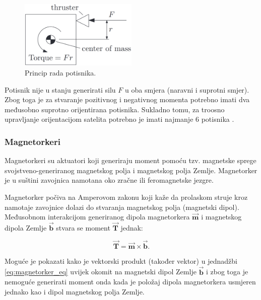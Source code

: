 \documentclass[times, utf8, diplomski, numeric]{templates/template}
\begin{document}
{{{{                \begin{figure}[htb]
                \centering
                \includegraphics[width=0.5\textwidth]{images/thruster_img.png}
                \caption{Princip rada potisnika.}
                \label{fig:thruster_img}
                \end{figure}

                Potisnik nije u stanju generirati silu $F$ u oba smjera (naravni i suprotni smjer). Zbog toga je za stvaranje pozitivnog i negativnog momenta potrebno imati dva međusobno suprotno orijentirana potisnika. Sukladno tomu, za troosno upravljanje orijentacijom satelita potrebno je imati najmanje 6 potisnika \cite{adcsKnjiga}.
            }

            \subsubsection{Magnetorkeri }{
                Magnetorkeri su aktuatori koji generiraju moment pomoću tzv. magnetske sprege svojstveno-generiranog magnetskog polja i magnetskog polja Zemlje. Magnetorker je u suštini zavojnica namotana oko zračne ili feromagnetske jezgre. 

                Magnetorker počiva na Amperovom zakonu koji kaže da prolaskom struje kroz namotaje zavojnice dolazi do stvaranja magnetskog polja (magnetski dipol). Međusobnom interakcijom generiranog dipola magnetorkera $\overrightarrow{\boldsymbol{m}}$ i magnetskog dipola Zemlje $\overrightarrow{\boldsymbol{b}}$ stvara se moment $\overrightarrow{\boldsymbol{T}}$ jednak:

                \begin{equation}
                    \label{eq:magnetorker_eq}
                    \overrightarrow{\boldsymbol{T}} = \overrightarrow{\boldsymbol{m}} \times \overrightarrow{\boldsymbol{b}}.
                \end{equation}

                Moguće je pokazati kako je vektorski produkt (također vektor) u jednadžbi \ref{eq:magnetorker_eq} uvijek okomit na magnetski dipol Zemlje $\overrightarrow{\boldsymbol{b}}$ i zbog toga je nemoguće generirati moment onda kada je položaj dipola magnetorkera usmjeren jednako kao i dipol magnetskog polja Zemlje.

}}}}
\end{document}

